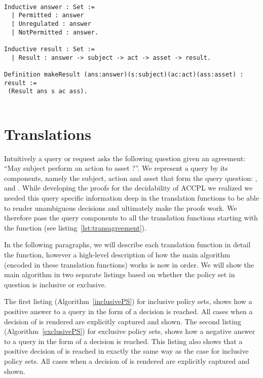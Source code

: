 \begin{minipage}[c]{0.95\textwidth}
\begin{lstlisting}

Inductive answer : Set :=
  | Permitted : answer
  | Unregulated : answer
  | NotPermitted : answer.
  
Inductive result : Set :=
  | Result : answer -> subject -> act -> asset -> result.
 
Definition makeResult (ans:answer)(s:subject)(ac:act)(ass:asset) : result := 
 (Result ans s ac ass).
 
\end{lstlisting}
\end{minipage}

\section{Translations}\label{sec:translationfuncs}

Intuitively a query or request asks the following question given an agreement: ``May subject  perform an action  to asset ?''. We represent a query by its components, namely the subject, action and asset that form the query question: ,  and . While developing the proofs for the decidability of \ac{ACCPL} we realized we needed this query specific information deep in the translation functions to be able to render unambiguous decisions and ultimately make the proofs work. We therefore pass the query components to all the translation functions starting with the  function (see listing~\ref{lst:transagreement}). 

In the following paragraphs, we will describe each translation function in detail the  function, however a high-level description of how the main algorithm (encoded in these translation functions) works is now in order. We will show the main algorithm in two separate listings based on whether the policy set in question is inclusive or exclusive. 

The first listing (Algorithm~\ref{inclusivePS}) for inclusive policy sets, shows how a positive answer to a query in the form of a  decision is reached. All cases when a decision of  is rendered are explicitly captured and shown. The second listing (Algorithm~\ref{exclusivePS}) for exclusive policy sets, shows how a negative answer to a query in the form of a  decision is reached. This listing also shows that a positive decision of  is reached in exactly the same way as the case for inclusive policy sets. All cases when a decision of  is rendered are explicitly captured and shown.

